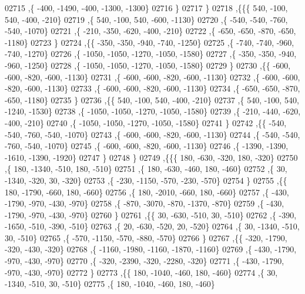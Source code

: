 \begin{DoxyCode}
02715     ,\{  -400, -1490,  -400, -1300, -1300\}
02716     \}
02717    \}
02718   ,\{\{\{   540,  -100,   540,  -400,  -210\}
02719     ,\{   540,  -100,   540,  -600, -1130\}
02720     ,\{  -540,  -540,  -760,  -540, -1070\}
02721     ,\{  -210,  -350,  -620,  -400,  -210\}
02722     ,\{  -650,  -650,  -870,  -650, -1180\}
02723     \}
02724    ,\{\{  -350,  -350,  -940,  -740, -1250\}
02725     ,\{  -740,  -740,  -960,  -740, -1270\}
02726     ,\{ -1050, -1050, -1270, -1050, -1580\}
02727     ,\{  -350,  -350,  -940,  -960, -1250\}
02728     ,\{ -1050, -1050, -1270, -1050, -1580\}
02729     \}
02730    ,\{\{  -600,  -600,  -820,  -600, -1130\}
02731     ,\{  -600,  -600,  -820,  -600, -1130\}
02732     ,\{  -600,  -600,  -820,  -600, -1130\}
02733     ,\{  -600,  -600,  -820,  -600, -1130\}
02734     ,\{  -650,  -650,  -870,  -650, -1180\}
02735     \}
02736    ,\{\{   540,  -100,   540,  -400,  -210\}
02737     ,\{   540,  -100,   540, -1240, -1530\}
02738     ,\{ -1050, -1050, -1270, -1050, -1580\}
02739     ,\{  -210,  -440,  -620,  -400,  -210\}
02740     ,\{ -1050, -1050, -1270, -1050, -1580\}
02741     \}
02742    ,\{\{  -540,  -540,  -760,  -540, -1070\}
02743     ,\{  -600,  -600,  -820,  -600, -1130\}
02744     ,\{  -540,  -540,  -760,  -540, -1070\}
02745     ,\{  -600,  -600,  -820,  -600, -1130\}
02746     ,\{ -1390, -1390, -1610, -1390, -1920\}
02747     \}
02748    \}
02749   ,\{\{\{   180,  -630,  -320,   180,  -320\}
02750     ,\{   180, -1340,  -510,   180,  -510\}
02751     ,\{   180,  -630,  -460,   180,  -460\}
02752     ,\{    30, -1340,  -320,    30,  -320\}
02753     ,\{  -230, -1150,  -570,  -230,  -570\}
02754     \}
02755    ,\{\{   180, -1790,  -660,   180,  -660\}
02756     ,\{   180, -2010,  -660,   180,  -660\}
02757     ,\{  -430, -1790,  -970,  -430,  -970\}
02758     ,\{  -870, -3070,  -870, -1370,  -870\}
02759     ,\{  -430, -1790,  -970,  -430,  -970\}
02760     \}
02761    ,\{\{    30,  -630,  -510,    30,  -510\}
02762     ,\{  -390, -1650,  -510,  -390,  -510\}
02763     ,\{    20,  -630,  -520,    20,  -520\}
02764     ,\{    30, -1340,  -510,    30,  -510\}
02765     ,\{  -570, -1150,  -570,  -880,  -570\}
02766     \}
02767    ,\{\{  -320, -1790,  -320,  -430,  -320\}
02768     ,\{ -1160, -1980, -1160, -1870, -1160\}
02769     ,\{  -430, -1790,  -970,  -430,  -970\}
02770     ,\{  -320, -2390,  -320, -2280,  -320\}
02771     ,\{  -430, -1790,  -970,  -430,  -970\}
02772     \}
02773    ,\{\{   180, -1040,  -460,   180,  -460\}
02774     ,\{    30, -1340,  -510,    30,  -510\}
02775     ,\{   180, -1040,  -460,   180,  -460\}

\end{DoxyCode}
